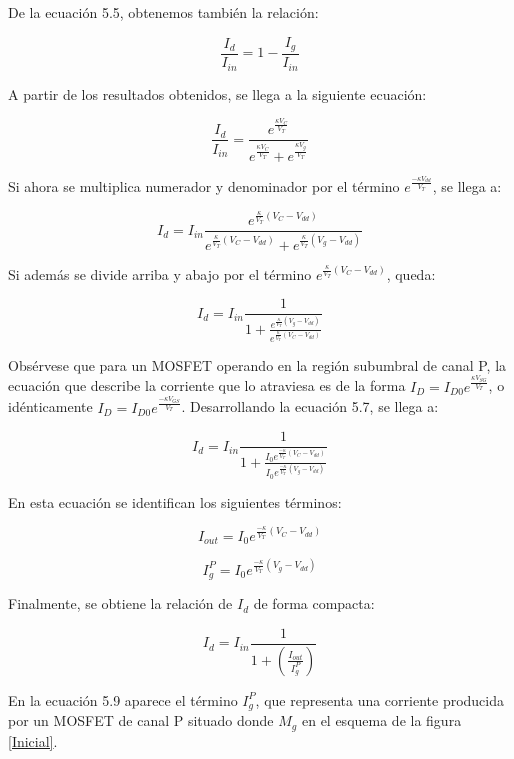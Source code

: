 De la ecuación 5.5, obtenemos también la relación:

$$\frac{I_d}{I_{in}}=1-\frac{I_g}{I_{in}}$$

A partir de los resultados obtenidos, se llega a la siguiente ecuación:

\begin{equation}
\frac{I_d}{I_{in}}=\frac{e^{\frac{\kappa V_C}{V_T}}}{e^{\frac{\kappa V_C}{V_T}}+e^{\frac{\kappa V_g}{V_T}}}
\end{equation}

Si ahora se multiplica numerador y denominador por el término $e^{\frac{-\kappa V_{dd}}{V_T}}$, se llega a:

$$I_d=I_{in}\frac{e^{\frac{\kappa}{V_T}(V_C-V_{dd})}}{e^{\frac{\kappa}{V_T}(V_C-V_{dd})}+e^{\frac{\kappa}{V_T}(V_g-V_{dd})}}$$

Si además se divide arriba y abajo por el término $e^{\frac{\kappa}{V_T}(V_C-V_{dd})}$, queda:

\begin{equation}
I_d=I_{in}\frac{1}{1+\frac{e^{\frac{\kappa}{V_T}(V_g-V_{dd})}}{e^{\frac{\kappa}{V_T}(V_C-V_{dd})}}}
\end{equation}

Obsérvese que para un MOSFET operando en la región subumbral de canal P, la ecuación que describe la corriente que lo atraviesa es de la forma $I_D=I_{D0}e^{\frac{\kappa V_{SG}}{V_T}}$, o idénticamente $I_D=I_{D0}e^{\frac{-\kappa V_{GS}}{V_T}}$. Desarrollando la ecuación 5.7, se llega a:

\begin{equation}
I_d=I_{in}\frac{1}{1+\frac{I_0e^{\frac{-\kappa}{V_T}(V_C-V_{dd})}}{I_0e^{\frac{-\kappa}{V_T}(V_g-V_{dd})}}}
\end{equation}

En esta ecuación se identifican los siguientes términos:

$$I_{out}=I_0e^{\frac{-\kappa}{V_T}(V_C-V_{dd})}$$

$$I_g^P=I_0e^{\frac{-\kappa}{V_T}(V_g-V_{dd})}$$

Finalmente, se obtiene la relación de $I_d$ de forma compacta:

\begin{equation}
I_d=I_{in}\frac{1}{1+(\frac{I_{out}}{I_g^P})}
\end{equation}

En la ecuación 5.9 aparece el término $I_g^P$, que representa una corriente producida por un MOSFET de canal P situado donde $M_g$ en el esquema de la figura \ref{Inicial}.

